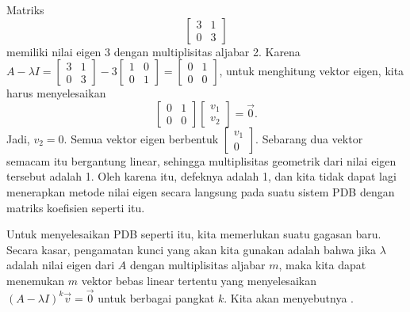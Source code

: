 \begin{example}
Matriks
\begin{equation*}
\begin{bmatrix}
3 & 1 \\ 0 & 3
\end{bmatrix}
\end{equation*}
memiliki nilai eigen 3 dengan multiplisitas aljabar 2.
Karena 
$A-\lambda I = \left[ \begin{smallmatrix} 3 & 1 \\ 0 & 3 \end{smallmatrix} \right]
- 3
\left[ \begin{smallmatrix} 1 & 0 \\ 0 & 1 \end{smallmatrix} \right]
=
\left[ \begin{smallmatrix} 0 & 1 \\ 0 & 0 \end{smallmatrix} \right]
$, untuk menghitung vektor eigen, kita harus menyelesaikan
\begin{equation*}
\begin{bmatrix}
0 & 1 \\ 0 & 0
\end{bmatrix}
\begin{bmatrix}
v_1 \\ v_2
\end{bmatrix}
= \vec{0} .
\end{equation*}
Jadi, $v_2 = 0$.  Semua vektor eigen berbentuk
$\left[ \begin{smallmatrix} v_1 \\ 0 \end{smallmatrix} \right]$.  Sebarang dua
vektor semacam itu bergantung linear, sehingga multiplisitas geometrik
dari nilai eigen tersebut adalah 1.  Oleh karena itu, defeknya adalah 1, dan kita tidak dapat lagi
menerapkan metode nilai eigen secara langsung pada suatu sistem PDB dengan
matriks koefisien seperti itu.

\medskip

Untuk menyelesaikan PDB seperti itu\@, kita memerlukan suatu gagasan baru.
Secara kasar, pengamatan kunci yang akan kita gunakan adalah bahwa
jika $\lambda$ adalah nilai eigen dari $A$ dengan multiplisitas aljabar $m$,
maka kita dapat menemukan $m$ vektor bebas linear tertentu
yang menyelesaikan ${(A-\lambda I)}^k \vec{v} = \vec{0}$ untuk berbagai pangkat
$k$.  Kita akan menyebutnya \emph{}.

\medskip


\end{example}
